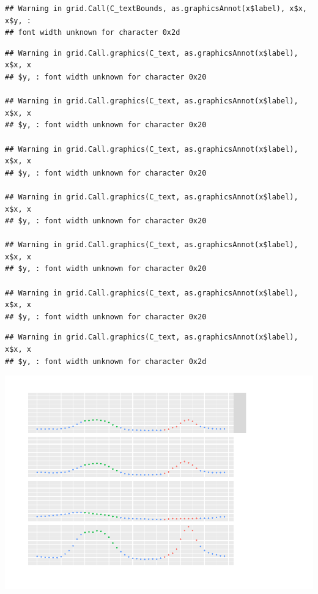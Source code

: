 \documentclass[]{article}
\theoremstyle{definition}
\theoremstyle{definition}
\theoremstyle{definition}
\theoremstyle{remark}
\begin{document}
\begin{verbatim}
## Warning in grid.Call(C_textBounds, as.graphicsAnnot(x$label), x$x, x$y, :
## font width unknown for character 0x2d
\end{verbatim}

\begin{verbatim}
## Warning in grid.Call.graphics(C_text, as.graphicsAnnot(x$label), x$x, x
## $y, : font width unknown for character 0x20

## Warning in grid.Call.graphics(C_text, as.graphicsAnnot(x$label), x$x, x
## $y, : font width unknown for character 0x20

## Warning in grid.Call.graphics(C_text, as.graphicsAnnot(x$label), x$x, x
## $y, : font width unknown for character 0x20

## Warning in grid.Call.graphics(C_text, as.graphicsAnnot(x$label), x$x, x
## $y, : font width unknown for character 0x20

## Warning in grid.Call.graphics(C_text, as.graphicsAnnot(x$label), x$x, x
## $y, : font width unknown for character 0x20

## Warning in grid.Call.graphics(C_text, as.graphicsAnnot(x$label), x$x, x
## $y, : font width unknown for character 0x20
\end{verbatim}

\begin{verbatim}
## Warning in grid.Call.graphics(C_text, as.graphicsAnnot(x$label), x$x, x
## $y, : font width unknown for character 0x2d
\end{verbatim}

\includegraphics{heatPumpProfileAnalysis_files/figure-latex/visualising peak/off-peak-1.pdf}
\end{document}
